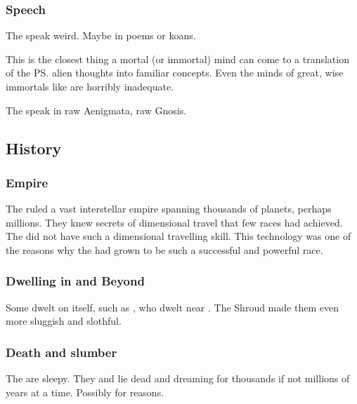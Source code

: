 \subsubsection{Speech}
The \xss{} speak weird. 
Maybe in poems or koans. 

This is the closest thing a mortal (or immortal) mind can come to a translation of the \ps{\xss} alien thoughts into familiar concepts. 
Even the minds of great, wise immortals like \QuessanthIshnaruchaefir{} are horribly inadequate. 

The \xss{} speak in raw Aenigmata, raw Gnosis. 










\subsection{History}





\subsubsection{Empire}
The \xss ruled a vast interstellar empire spanning thousands of planets, perhaps millions. 
They knew secrets of dimensional travel that few races had achieved.
The \banes did not have such a dimensional travelling skill. 
This technology was one of the reasons why the \xss had grown to be such a successful and powerful race. 




\subsubsection{Dwelling in \Miith and Beyond}
Some \xss dwelt on \Miith itself, such as , who dwelt near \Yormis.
The Shroud made them even more sluggish and slothful. 





\subsubsection{Death and slumber}
The \xss{} are sleepy. They  and lie dead and dreaming for thousands if not millions of years at a time. 
Possibly for  reasons. 

